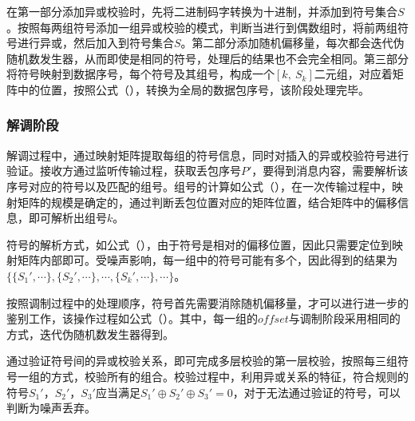 在第一部分添加异或校验时，先将二进制码字转换为十进制，并添加到符号集合$S$。按照每两组符号添加一组异或校验的模式，判断当进行到偶数组时，将前两组符号进行异或，然后加入到符号集合$S$。第二部分添加随机偏移量，每次都会迭代伪随机数发生器，从而即使是相同的符号，处理后的结果也不会完全相同。第三部分将符号映射到数据序号，每个符号及其组号，构成一个$[k,\ S_{k}]$二元组，对应着矩阵中的位置，按照公式（），转换为全局的数据包序号，该阶段处理完毕。

\subsubsection{解调阶段}
\label{chap:hash:robustness:xor:demodulation}


解调过程中，通过映射矩阵提取每组的符号信息，同时对插入的异或校验符号进行验证。接收方通过监听传输过程，获取丢包序号$P'$，要得到消息内容，需要解析该序号对应的符号以及匹配的组号。组号的计算如公式（），在一次传输过程中，映射矩阵的规模是确定的，通过判断丢包位置对应的矩阵位置，结合矩阵中的偏移信息，即可解析出组号$k$。

符号的解析方式，如公式（），由于符号是相对的偏移位置，因此只需要定位到映射矩阵内部即可。受噪声影响，每一组中的符号可能有多个，因此得到的结果为$\{\{S_1',\cdots\},\{S_2',\cdots\},\cdots, \{S_k',\cdots\}, \cdots\}$。

按照调制过程中的处理顺序，符号首先需要消除随机偏移量，才可以进行进一步的鉴别工作，该操作过程如公式（）。其中，每一组的$offset$与调制阶段采用相同的方式，迭代伪随机数发生器得到。

通过验证符号间的异或校验关系，即可完成多层校验的第一层校验，按照每三组符号一组的方式，校验所有的组合。校验过程中，利用异或关系的特征，符合规则的符号$S_1'$，$S_2'$，$S_3'$应当满足$S_1'\oplus S_2'\oplus S_3' = 0$，对于无法通过验证的符号，可以判断为噪声丢弃。